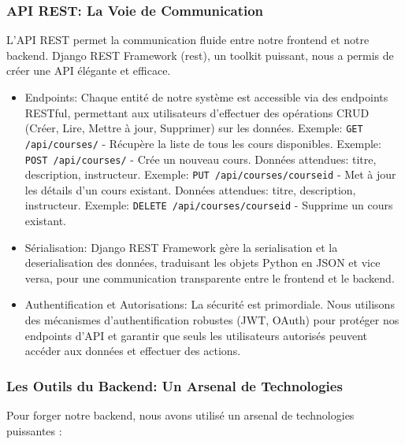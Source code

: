 \subsubsection{API REST: La Voie de Communication}

L'API REST permet la communication fluide entre notre frontend et notre backend.  Django REST Framework (\gls{rest}), un toolkit puissant, nous a permis de créer une API élégante et efficace.
\begin{itemize}
    \item Endpoints: Chaque entité de notre système est accessible via des endpoints RESTful, permettant aux utilisateurs d'effectuer des opérations CRUD (Créer, Lire, Mettre à jour, Supprimer) sur les données.
        \subitem Exemple:  \texttt{GET /api/courses/} - Récupère la liste de tous les cours disponibles.
        \subitem Exemple:  \texttt{POST /api/courses/} - Crée un nouveau cours.  Données attendues: titre, description, instructeur.
        \subitem Exemple:  \texttt{PUT /api/courses/{courseid}} - Met à jour les détails d'un cours existant.  Données attendues: titre, description, instructeur.
        \subitem Exemple:  \texttt{DELETE /api/courses/{courseid}} - Supprime un cours existant.
    \item Sérialisation:   Django REST Framework gère la \gls{serialisation} et la \gls{deserialisation} des données, traduisant les objets Python en JSON et vice versa, pour une communication transparente entre le frontend et le backend.
    \item Authentification et Autorisations:  La sécurité est primordiale.  Nous utilisons des mécanismes d'authentification robustes (JWT, OAuth) pour protéger nos endpoints d'API et garantir que seuls les utilisateurs autorisés peuvent accéder aux données et effectuer des actions.
\end{itemize}

\subsubsection{Les Outils du Backend: Un Arsenal de Technologies}

Pour forger notre backend, nous avons utilisé un arsenal de technologies puissantes :

